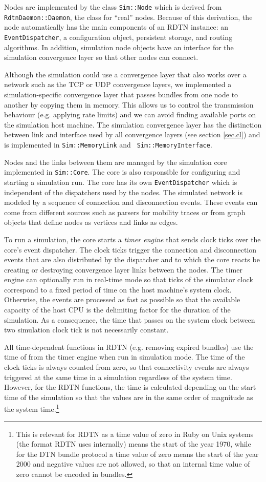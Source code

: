 \documentclass{article}
\begin{document}
Nodes are implemented by the class {\tt Sim::Node} which is derived from {\tt
RdtnDaemon::Daemon}, the class for ``real'' nodes. Because of this derivation,
the node automatically has the main components of an RDTN instance: an {\tt
EventDispatcher}, a configuration object, persistent storage, and routing
algorithms. In addition, simulation node objects have an interface for the
simulation convergence layer so that other nodes can connect.

Although the simulation could use a convergence layer that also works over a
network such as the TCP or UDP convergence layers, we implemented a
simulation-specific convergence layer that passes bundles from one node to
another by copying them in memory. This allows us to control the transmission
behaviour (e.g. applying rate limits) and we can avoid finding available ports
on the simulation host machine. The simulation convergence layer has
the distinction between link and interface used by all convergence layers (see
section \ref{sec.cl}) and is implemented in {\tt Sim::MemoryLink} and {\tt
Sim::MemoryInterface}.

Nodes and the links between them are managed by the simulation core implemented
in {\tt Sim::Core}. The core is also responsible for configuring and starting a
simulation run. The core has its own {\tt EventDispatcher} which is independent
of the dispatchers used by the nodes. The simulated network is modeled by a
sequence of connection and disconnection events. These events can come from
different sources such as parsers for mobility traces or from graph objects that
define nodes as vertices and links as edges.

To run a simulation, the core starts a {\em timer engine} that sends clock ticks
over the core's event dispatcher. The clock ticks trigger the connection and
disconnection events that are also distributed by the dispatcher and to which
the core reacts be creating or destroying convergence layer links between the
nodes. The timer engine can optionally run in real-time mode so that ticks of
the simulator clock correspond to a fixed period of time on the host machine's
system clock. Otherwise, the events are processed as fast as possible so that
the available capacity of the host CPU is the delimiting factor for the duration
of the simulation. As a consequence, the time that passes on the system clock
between two simulation clock tick is not necessarily constant.

All time-dependent functions in RDTN (e.g. removing expired bundles) use the
time of from the timer engine when run in simulation mode.  The time of the
clock ticks is always counted from zero, so that connectivity events are always
triggered at the same time in a simulation regardless of the system time.
However, for the RDTN functions, the time is calculated depending on the start
time of the simulation so that the values are in the same order of magnitude as
the system time.\footnote{This is relevant for RDTN as a time value of zero in
Ruby on Unix systems (the format RDTN uses internally) means the start of the
year 1970, while for the DTN bundle protocol a time value of zero means the
start of the year 2000 and negative values are not allowed, so that an internal
time value of zero cannot be encoded in bundles.}
\end{document}
